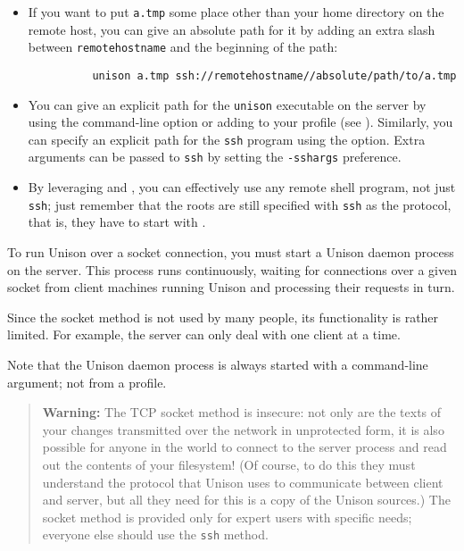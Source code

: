 \documentclass{article}
\begin{document}
\begin{itemize}
\item If you want to put \verb|a.tmp| some place other than your home
directory on the remote host, you can give an absolute path for it by
adding an extra slash between \verb|remotehostname| and the beginning
of the path:
\begin{verbatim}
          unison a.tmp ssh://remotehostname//absolute/path/to/a.tmp
\end{verbatim}

\item You can give an explicit path for the \verb|unison| executable
  on the server by using the command-line option  or adding
   to your profile (see
  ).  Similarly, you can specify an
  explicit path for the \verb|ssh| program using the 
  option.
  Extra arguments can be passed to \verb|ssh| by setting the
  \verb|-sshargs| preference.

\item By leveraging  and , you can
  effectively use any remote shell program, not just \verb|ssh|; just
  remember that the roots are still specified with \verb|ssh| as the
  protocol, that is, they have to start with .
\end{itemize}



To run Unison over a socket connection, you must start a Unison
daemon process on the server.  This process runs continuously,
waiting for connections over a given socket from client machines
running Unison and processing their requests in turn.

Since the socket method is not used by many people, its functionality is
rather limited.  For example, the server can only deal with one client at a
time.

Note that the Unison daemon process is always started with a command-line
argument; not from a profile.


\begin{quote}
  {\bf\ifhevea\red\fi Warning:} The TCP socket method is
  insecure: not only are the texts of your changes transmitted over
  the network in unprotected form, it is also possible for anyone in
  the world to connect to the server process and read out the contents
  of your filesystem!  (Of course, to do this they must understand the
  protocol that Unison uses to communicate between client and server,
  but all they need for this is a copy of the Unison sources.)  The socket
  method is provided only for expert users with specific needs; everyone
  else should use the \verb|ssh| method.
\end{quote}
\end{document}
